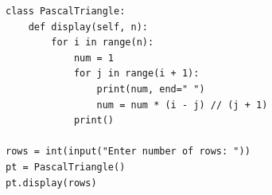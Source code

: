 \begin{verbatim}
class PascalTriangle:
    def display(self, n):
        for i in range(n):
            num = 1
            for j in range(i + 1):
                print(num, end=" ")
                num = num * (i - j) // (j + 1)
            print()

rows = int(input("Enter number of rows: "))
pt = PascalTriangle()
pt.display(rows)
\end{verbatim}